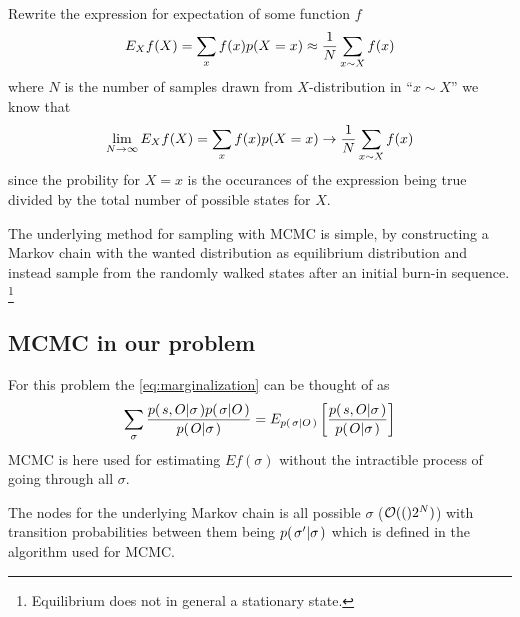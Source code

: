 \documentclass[a4paper,11pt]{kth-mag}
\begin{document}
                Rewrite the expression for expectation of some function $f$
                \begin{equation}
                    E_X f(X) 
                    = \sum\limits_x f(x)p{(X=x)} 
                    \approx \frac{1}{N} \sum\limits_{x\sim X} f(x)
                \end{equation}
                where $N$ is the number of samples drawn from $X$-distribution in ``$x\sim X$'' we know that
                \begin{equation}
                    \lim_{N\rightarrow\infty} E_X f(X) 
                    = \sum\limits_x f(x)p{(X=x)} 
                    \rightarrow \frac{1}{N} \sum\limits_{x\sim X} f(x)
                \end{equation}
                since the probility for $X=x$ is the occurances of the expression being true 
                divided by the total number of possible states for $X$.

                The underlying method for sampling with MCMC is simple, by 
                constructing a Markov chain with the wanted distribution as 
                equilibrium distribution and instead sample from 
                the randomly walked states after an initial burn-in sequence.
                \footnote{Equilibrium does not in general a stationary state.}

           \subsection{MCMC in our problem} 
                For this problem the \eqref{eq:marginalization} can be thought of as
                \begin{equation}
                    \sum\limits_\sigma
                    \frac{
                        p{(\left. s,O \middle\vert \sigma \right.)}p{(\left. \sigma \middle\vert O \right.)}
                    }{
                        p{(\left. O \middle\vert \sigma \right.)}
                    }
                    = E_{p{(\left. \sigma \middle\vert O \right.)}}\left[{
                        \frac{
                            p{(\left. s,O \middle\vert \sigma \right.)}
                        }{
                            p{(\left. O \middle\vert \sigma \right.)}
                        }
                    }\right]
                \end{equation}
                MCMC is here used for estimating $E{f(\sigma)}$ without the intractible 
                process of going through all $\sigma$.
               
                The nodes for the underlying Markov chain is all possible 
                $\sigma$ ($\mathcal{O}{\left((\right)}2^N)$) 
                with transition probabilities between them being
                $p{(\left. \sigma' \middle\vert \sigma \right.)}$ which is defined in the algorithm 
                used for MCMC.
\end{document}
